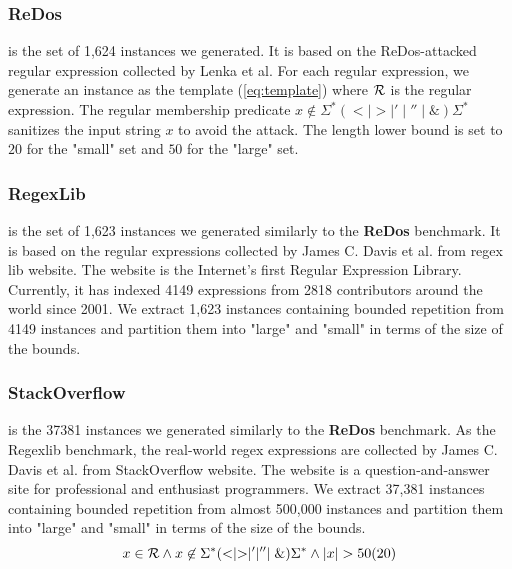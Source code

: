 \subsubsection{ReDos} is the set of 1,624 instances we generated. It is based on the ReDos-attacked regular expression collected by Lenka et al. For each regular expression, we generate an instance as the template (\ref{eq:template}) where $\mathcal{R}$ is the regular expression. The regular membership predicate $x\not\in \Sigma^*(<\mid >\mid '\mid ''\mid \&)\Sigma^*$ sanitizes the input string $x$ to avoid the attack. The length lower bound is set to $20$ for the "small" set and $50$ for the "large" set.
\subsubsection{RegexLib} is the set of 1,623 instances we generated similarly to the \textbf{ReDos} benchmark. It is based on the regular expressions collected by James C. Davis et al.\cite{regex_lingua_franca} from regex lib website\cite{regexlib}. The website is the Internet's first Regular Expression Library. Currently, it has indexed 4149 expressions from 2818 contributors around the world since 2001. We extract 1,623 instances containing bounded repetition from 4149 instances and partition them into "large" and "small" in terms of the size of the bounds.
\subsubsection{StackOverflow} is the 37381 instances we generated similarly to the \textbf{ReDos} benchmark. As the Regexlib benchmark, the real-world regex expressions are collected by James C. Davis et al.\cite{regex_lingua_franca} from StackOverflow website\cite{stackoverflow}. The website is a question-and-answer site for professional and enthusiast programmers. We extract 37,381 instances containing bounded repetition from almost 500,000 instances and partition them into "large" and "small" in terms of the size of the bounds.
\begin{equation} \label{eq:template}
  x\in \mathcal{R} \wedge x\not\in \Sigma^*(<\mid >\mid '\mid ''\mid \&)\Sigma^*\wedge |x| > 50(20)
\end{equation}
